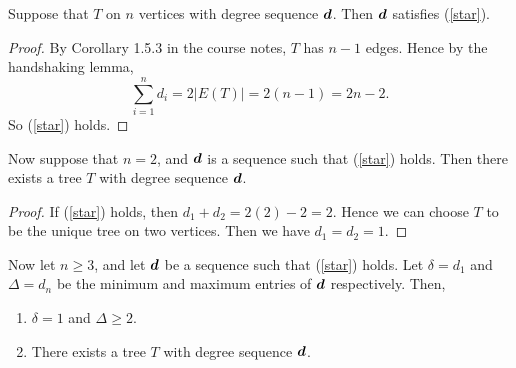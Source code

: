 \documentclass{unswmaths}
\begin{document}
\begin{proposition}
\label{2a}
    Suppose that $T$ on $n$ vertices with degree sequence $\boldsymbol{d}$.
    Then $\boldsymbol{d}$ satisfies (\ref{star}).
\end{proposition}
\begin{proof}
    By Corollary 1.5.3 in the course notes, $T$ has $n-1$ edges.
    Hence by the handshaking lemma,
    \begin{equation}
        \sum_{i=1}^n d_i = 2|E(T)| = 2(n-1) = 2n-2.
    \end{equation}
    So (\ref{star}) holds.
\end{proof} 
\begin{proposition}
\label{2b}
    Now suppose that $n = 2$, and $\boldsymbol{d}$ is a sequence such that
    (\ref{star}) holds. Then there exists a tree $T$ with degree
    sequence $\boldsymbol{d}$.
\end{proposition}
\begin{proof}
    If (\ref{star}) holds, then $d_1+d_2 = 2(2)-2 = 2$. Hence
    we can choose $T$ to be the unique tree on two vertices. Then
    we have $d_1 = d_2 = 1$.
\end{proof}
\begin{proposition}
\label{2c}
    Now let $n \geq 3$, and let $\boldsymbol{d}$ be a sequence such that (\ref{star}) holds.
    Let $\delta = d_1$ and $\Delta = d_n$ be the minimum and maximum entries of $\boldsymbol{d}$
    respectively. Then,
    \begin{enumerate}
        \item{} $\delta = 1$ and $\Delta \geq 2$.
        \item{} There exists a tree $T$ with degree sequence $\boldsymbol{d}$.
    \end{enumerate}
\end{proposition}
\end{document}
